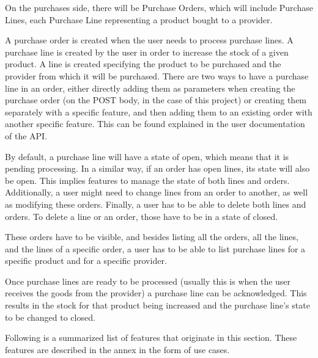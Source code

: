 On the purchases side, there will be Purchase Orders, which will include Purchase Lines, each Purchase Line representing a product bought to a provider.

A purchase order is created when the user needs to process purchase lines. A purchase line is created by the user in order to increase the stock of a given product. A line is created specifying the product to be purchased and the provider from which it will be purchased. There are two ways to have a purchase line in an order, either directly adding them as parameters when creating the purchase order (on the POST body, in the case of this project) or creating them separately with a specific feature, and then adding them to an existing order with another specific feature. This can be found explained in the user documentation of the API.

By default, a purchase line will have a state of open, which means that it is pending processing. In a similar way, if an order has open lines, its state will also be open. This implies features to manage the state of both lines and orders. Additionally, a user might need to change lines from an order to another, as well as modifying these orders. Finally, a user has to be able to delete both lines and orders. To delete a line or an order, those have to be in a state of closed.

These orders have to be visible, and besides listing all the orders, all the lines, and the lines of a specific order, a user has to be able to list purchase lines for a specific product and for a specific provider.

Once purchase lines are ready to be processed (usually this is when the user receives the goods from the provider) a purchase line can be acknowledged. This results in the stock for that product being increased and the purchase line’s state to be changed to closed.

Following is a summarized list of features that originate in this section. These features are described in the annex in the form of use cases.

